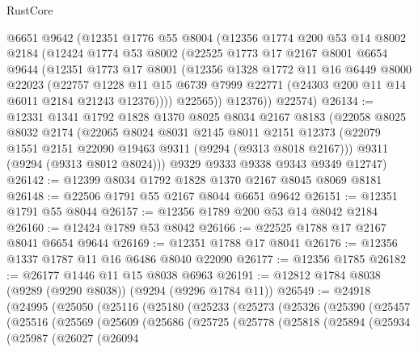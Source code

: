 \begin{lexlean}{RustCore}
\begin{coremodule}
      @6651
      @9642
      (@12351
        @1776
        @55
        @8004
        (@12356
          @1774
          @200
          @53
          @14
          @8002
          @2184
          (@12424
            @1774
            @53
            @8002
            (@22525
              @1773
              @17
              @2167
              @8001
              @6654
              @9644
              (@12351
                @1773
                @17
                @8001
                (@12356
                  @1328
                  @1772
                  @11
                  @16
                  @6449
                  @8000
                  @22023
                  (@22757
                    @1228
                    @11
                    @15
                    @6739
                    @7999
                    @22771
                    (@24303 @200 @11 @14 @6011 @2184 @21243 @12376))))
              @22565))
          @12376))
      @22574)
@26134 := @12331
    @1341
    @1792
    @1828
    @1370
    @8025
    @8034
    @2167
    @8183
    (@22058
      @8025
      @8032
      @2174
      (@22065
        @8024
        @8031
        @2145
        @8011
        @2151
        @12373
        (@22079 @1551 @2151 @22090 @19463 @9311 (@9294 (@9313 @8018 @2167)))
        @9311
        (@9294 (@9313 @8012 @8024)))
      @9329
      @9333
      @9338
      @9343
      @9349
      @12747)
@26142 := @12399 @8034 @1792 @1828 @1370 @2167 @8045 @8069 @8181
@26148 := @22506 @1791 @55 @2167 @8044 @6651 @9642
@26151 := @12351 @1791 @55 @8044
@26157 := @12356 @1789 @200 @53 @14 @8042 @2184
@26160 := @12424 @1789 @53 @8042
@26166 := @22525 @1788 @17 @2167 @8041 @6654 @9644
@26169 := @12351 @1788 @17 @8041
@26176 := @12356 @1337 @1787 @11 @16 @6486 @8040 @22090
@26177 := @12356 @1785
@26182 := @26177 @1446 @11 @15 @8038 @6963
@26191 := @12812 @1784 @8038 (@9289 (@9290 @8038)) (@9294 (@9296 @1784 @11))
@26549 := @24918
    (@24995
      (@25050
        (@25116
          (@25180
            (@25233
              (@25273
                (@25326
                  (@25390
                    (@25457
                      (@25516
                        (@25569
                          (@25609
                            (@25686
                              (@25725
                                (@25778
                                  (@25818
                                    (@25894
                                      (@25934
                                        (@25987
                                          (@26027
                                            (@26094

\end{coremodule}
\end{lexlean}
